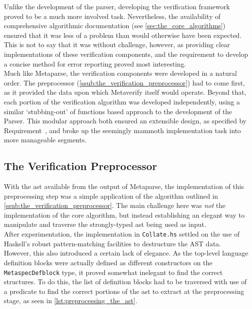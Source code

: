 Unlike the development of the parser, developing the verification framework proved to be a much more involved task. 
Nevertheless, the availability of comprehensive algorithmic documentation (see \autoref{sec:the_core_algorithms}) ensured that it was less of a problem than would otherwise have been expected.
This is not to say that it was without challenge, however, as providing clear implementations of these verification components, and the requirement to develop a concise method for error reporting proved most interesting.\\

Much like Metaparse, the verification components were developed in a natural order.
The preprocessor (\autoref{ssub:the_verification_preprocessor}) had to come first, as it provided the data upon which Metaverify itself would operate. 
Beyond that, each portion of the verification algorithm was developed independently, using a similar `stubbing-out' of functions based approach to the development of the Parser. 
This modular approach both ensured an extensible design, as specified by Requirement~, and broke up the seemingly mammoth implementation task into more manageable segments. 

\subsection{The Verification Preprocessor} %
\label{sub:the_verification_preprocessor}
With the \gls{ast} available from the output of Metaparse, the implementation of this preprocessing step was a simple application of the algorithm outlined in \autoref{ssub:the_verification_preprocessor}. 
The main challenge here was \textit{not} the implementation of the core algorithm, but instead establishing an elegant way to manipulate and traverse the strongly-typed \gls{ast} being used as input.\\

After experimentation, the implementation in \texttt{Collate.hs} settled on the use of Haskell's robust pattern-matching facilities to destructure the AST data.
However, this also introduced a certain lack of elegance. 
As the top-level language definition blocks were actually defined as different constructors on the \texttt{MetaspecDefblock} type, it proved somewhat inelegant to find the correct structures.
To do this, the list of definition blocks had to be traversed with use of a predicate to find the correct portions of the \gls{ast} to extract at the preprocessing stage, as seen in \autoref{lst:preprocessing_the_ast}.

